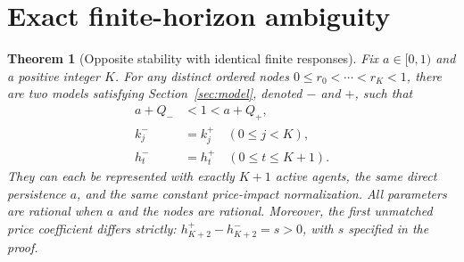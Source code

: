 \documentclass[11pt]{article}
\newtheorem{theorem}{Theorem}[section]
\theoremstyle{remark}\newtheorem{remark}[theorem]{Remark}
\begin{document}
\section{Exact finite-horizon ambiguity}\label{sec:theorem}
\begin{theorem}[Opposite stability with identical finite responses]\label{thm:pair}
Fix $a\in[0,1)$ and a positive integer $K$. For any distinct ordered nodes $0\le r_0<\cdots<r_K<1$, there are two models satisfying Section~\ref{sec:model}, denoted $-$ and $+$, such that
\begin{align}
 a+Q_-&<1<a+Q_+,\label{eq:opposite}\\
 k_j^-&=k_j^+\quad(0\le j<K),\label{eq:matchk}\\
 h_t^-&=h_t^+\quad(0\le t\le K+1).\label{eq:matchh}
\end{align}
They can each be represented with exactly $K+1$ active agents, the same direct persistence $a$, and the same constant price-impact normalization. All parameters are rational when $a$ and the nodes are rational. Moreover, the first unmatched price coefficient differs strictly: $h_{K+2}^+-h_{K+2}^-=s>0$, with $s$ specified in the proof.
\end{theorem}
\end{document}
